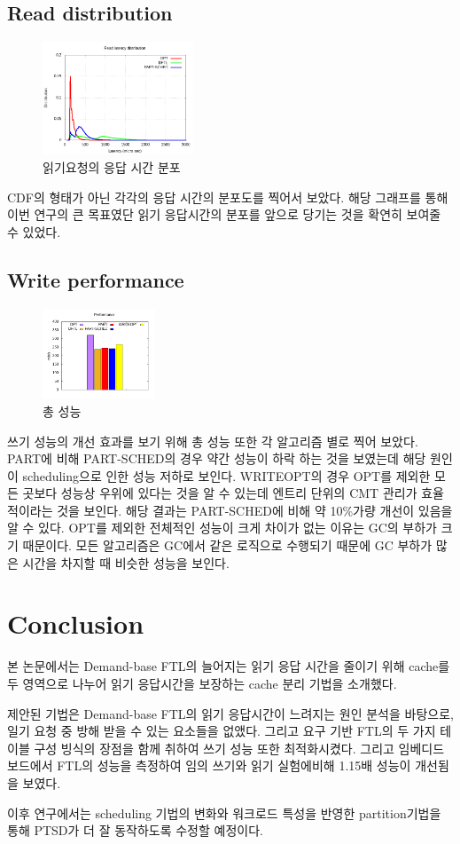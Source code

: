 \documentclass[conference]{IEEEtran}
\begin{document}
\subsection{Read distribution}
\begin{figure}[h]
	\centering
	\includegraphics[width=0.4\textwidth]{image/EVAL/dist.png}
	\caption{읽기요청의  응답 시간 분포}
	\label{fig:dist}
\end{figure}
CDF의 형태가 아닌 각각의 응답 시간의 분포도를 찍어서 보았다. 해당 그래프를 통해 이번 연구의 큰 목표였단 읽기 응답시간의 분포를 앞으로 당기는 것을 확연히 보여줄 수 있었다.
\subsection{Write performance}
\begin{figure}[h]
	\centering
	\includegraphics[width=0.3\textwidth]{image/EVAL/through.png}
	\caption{총 성능}
	\label{fig:through}
\end{figure}
쓰기 성능의 개선 효과를 보기 위해 총 성능 또한 각 알고리즘 별로 찍어 보았다. PART에 비해  PART-SCHED의 경우 약간 성능이 하락 하는 것을 보였는데 해당 원인이 scheduling으로 인한 성능 저하로 보인다. WRITEOPT의 경우 OPT를 제외한 모든 곳보다 성능상 우위에 있다는 것을 알 수 있는데 엔트리 단위의 CMT 관리가 효율적이라는 것을 보인다. 해당 결과는 PART-SCHED에 비해 약 10\%가량 개선이 있음을 알 수 있다. OPT를 제외한 전체적인 성능이 크게 차이가 없는 이유는 GC의 부하가 크기 때문이다. 모든 알고리즘은 GC에서 같은 로직으로 수행되기 때문에 GC 부하가 많은 시간을 차지할 때 비슷한 성능을 보인다. 

\section{Conclusion}
본 논문에서는 Demand-base FTL의 늘어지는 읽기 응답 시간을 줄이기 위해 cache를 두 영역으로 나누어 읽기 응답시간을 보장하는 cache 분리 기법을 소개했다. \par
제안된 기법은 Demand-base FTL의 읽기 응답시간이 느려지는 원인 분석을 바탕으로, 일기 요청 중 방해 받을 수 있는 요소들을 없앴다. 그리고 요구 기반 FTL의 두 가지 테이블 구성 빙식의 장점을 함께 취하여 쓰기 성능 또한 최적화시켰다. 그리고 임베디드 보드에서 FTL의 성능을 측정하여 임의 쓰기와 읽기 실험에비해 1.15배 성능이 개선됨을 보였다.\par
이후 연구에서는 scheduling 기법의 변화와 워크로드 특성을 반영한 partition기법을 통해 PTSD가 더 잘 동작하도록 수정할 예정이다.
\end{document}
